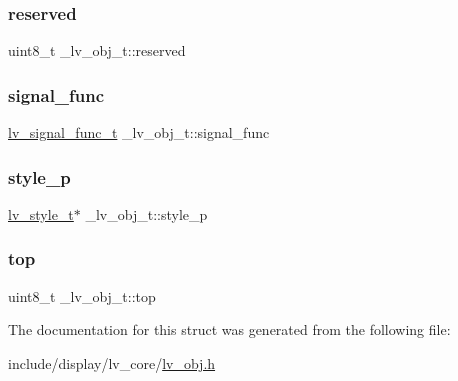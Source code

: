 \mbox{\label{struct__lv__obj__t_a98f692134136e4618ac4b1a9147245e6}} 
\subsubsection{\texorpdfstring{reserved}{reserved}}
{\footnotesize\ttfamily uint8\+\_\+t \+\_\+lv\+\_\+obj\+\_\+t\+::reserved}

\mbox{\label{struct__lv__obj__t_a67dfa50ddb472550147245d920ecf0e3}} 
\subsubsection{\texorpdfstring{signal\_func}{signal\_func}}
{\footnotesize\ttfamily \mbox{\hyperlink{lv__obj_8h_abf8b1b808dc0bff6efafc876c3063b33}{lv\+\_\+signal\+\_\+func\+\_\+t}} \+\_\+lv\+\_\+obj\+\_\+t\+::signal\+\_\+func}

\mbox{\label{struct__lv__obj__t_aae8e88ef15ba4eedf3150eb5d1ae7021}} 
\subsubsection{\texorpdfstring{style\_p}{style\_p}}
{\footnotesize\ttfamily \mbox{\hyperlink{structlv__style__t}{lv\+\_\+style\+\_\+t}}$\ast$ \+\_\+lv\+\_\+obj\+\_\+t\+::style\+\_\+p}

\mbox{\label{struct__lv__obj__t_af655d7f63d4713ee248868eb9cb995bd}} 
\subsubsection{\texorpdfstring{top}{top}}
{\footnotesize\ttfamily uint8\+\_\+t \+\_\+lv\+\_\+obj\+\_\+t\+::top}



The documentation for this struct was generated from the following file\+:\begin{DoxyCompactItemize}
\item 
include/display/lv\+\_\+core/\mbox{\hyperlink{lv__obj_8h}{lv\+\_\+obj.\+h}}\end{DoxyCompactItemize}
